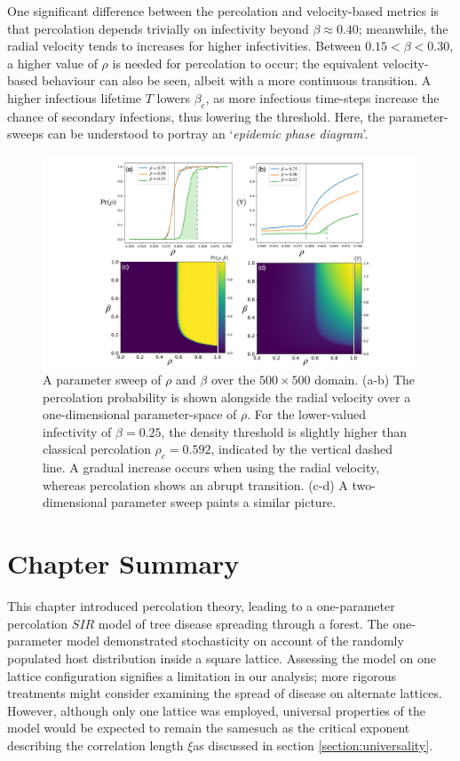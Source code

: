 One significant difference between the percolation and velocity-based metrics is that percolation depends trivially on infectivity beyond $\beta \approx 0.40$;
meanwhile, the radial velocity tends to increases for higher infectivities.
Between $0.15 <\beta<0.30$, a higher value of $\rho$ is needed for percolation to occur;
the equivalent velocity-based behaviour can also be seen, albeit with a more continuous transition.
A higher infectious lifetime $T$ lowers $\beta_c$, as more infectious time-steps increase the chance of secondary infections, thus lowering the threshold.
Here, the parameter-sweeps can be understood to portray an `\textit{epidemic phase diagram}'.

\begin{figure}
    \centering
    \includegraphics[scale=0.325]{chapter3/figures/figure4-perc-vel-phase-trans.pdf}
    \caption{
    A parameter sweep of $\rho$ and $\beta$ over the $500\times500$ domain. (a-b) The percolation probability is shown alongside the radial velocity over a one-dimensional parameter-space of $\rho$. For the lower-valued infectivity of $\beta=0.25$, the density threshold is slightly higher than classical percolation  $\rho_c=0.592$, indicated by the vertical dashed line. A gradual increase occurs when using the radial velocity, whereas percolation shows an abrupt transition. (c-d) A two-dimensional parameter sweep paints a similar picture.
    }
    \label{fig:slm_pspace}
\end{figure}

\newpage

\section{Chapter Summary}

This chapter introduced percolation theory, leading to a one-parameter percolation $SIR$ model of tree disease spreading through a forest.
The one-parameter model demonstrated stochasticity on account of the randomly populated host distribution inside a square lattice. 
Assessing the model on one lattice configuration signifies a limitation in our analysis; 
more rigorous treatments might consider examining the spread of disease on alternate lattices.
However, although only one lattice was employed, universal properties of the model would be expected to remain the same\textemdash such as the critical exponent describing the correlation length $\xi$\textemdash as discussed in section \ref{section:universality}.

